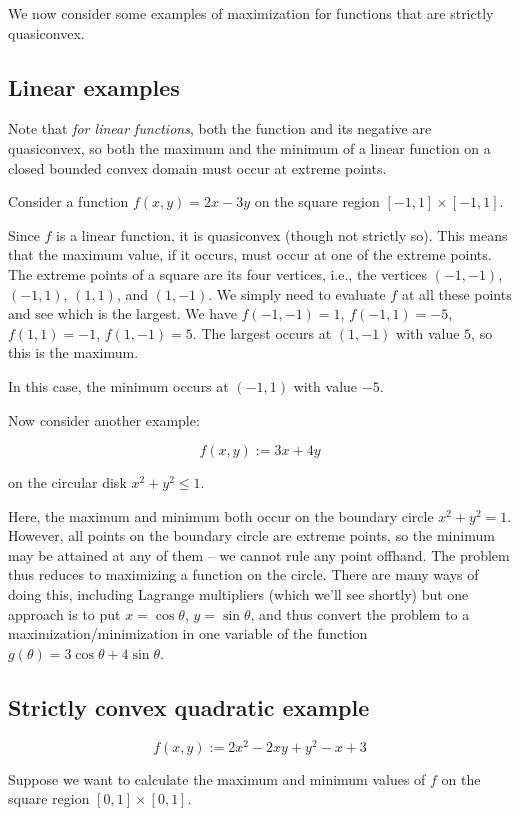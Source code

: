\documentclass[10pt]{amsart}
\begin{document}
We now consider some examples of maximization for functions that are
strictly quasiconvex.

\subsection{Linear examples}

Note that {\em for linear functions}, both the function and its
negative are quasiconvex, so both the maximum and the minimum of a
linear function on a closed bounded convex domain must occur at
extreme points.

Consider a function $f(x,y) = 2x - 3y$ on the square region $[-1,1]
\times [-1,1]$.

Since $f$ is a linear function, it is quasiconvex (though not strictly
so). This means that the maximum value, if it occurs, must occur at
one of the extreme points. The extreme points of a square are its four
vertices, i.e., the vertices $(-1,-1)$, $(-1,1)$, $(1,1)$, and
$(1,-1)$. We simply need to evaluate $f$ at all these points and see
which is the largest. We have $f(-1,-1) = 1$, $f(-1,1) = -5$, $f(1,1)
= -1$, $f(1,-1) = 5$. The largest occurs at $(1,-1)$ with value $5$,
so this is the maximum.

In this case, the minimum occurs at $(-1,1)$ with value $-5$.

Now consider another example:

$$f(x,y) := 3x + 4y$$

on the circular disk $x^2 + y^2 \le 1$.

Here, the maximum and minimum both occur on the boundary circle $x^2 +
y^2 = 1$. However, all points on the boundary circle are extreme
points, so the minimum may be attained at any of them -- we cannot
rule any point offhand. The problem thus reduces to maximizing a
function on the circle. There are many ways of doing this, including
Lagrange multipliers (which we'll see shortly) but one approach is to
put $x = \cos \theta$, $y = \sin \theta$, and thus convert the problem
to a maximization/minimization in one variable of the function
$g(\theta) = 3\cos \theta + 4 \sin \theta$.

\subsection{Strictly convex quadratic example}

$$f(x,y) := 2x^2 - 2xy + y^2 - x + 3$$

Suppose we want to calculate the maximum and minimum values of $f$ on
the square region $[0,1] \times [0,1]$.
\end{document}
